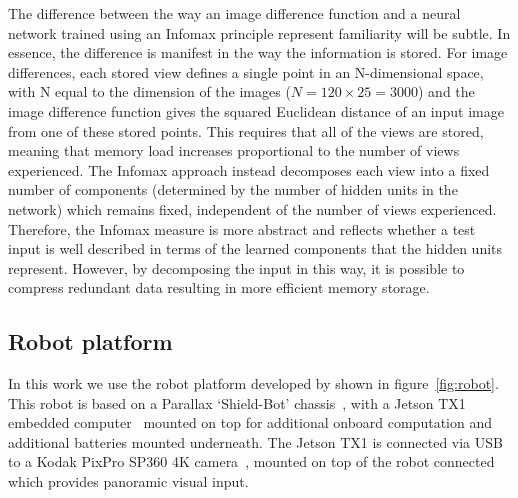 \documentclass[letterpaper]{article}
\begin{document}
The difference between the way an image difference function and a neural network trained using an Infomax principle represent familiarity will be subtle. 
In essence, the difference is manifest in the way the information is stored. 
For image differences, each stored view defines a single point in an N-dimensional space, with N equal to the dimension of the images ($N = 120 \times 25 = 3000$) and the image difference function gives the squared Euclidean distance of an input image from one of these stored points. 
This requires that all of the views are stored, meaning that memory load increases proportional to the number of views experienced. 
The Infomax approach instead decomposes each view into a fixed number of components (determined by the number of hidden units in the network) which remains fixed, independent of the number of views experienced. 
Therefore, the Infomax measure is more abstract and reflects whether a test input is well described in terms of the learned components that the hidden units represent. 
However, by decomposing the input in this way, it is possible to compress redundant data resulting in more efficient memory storage.


\subsection{Robot platform}
\label{sec:robot_platform}
In this work we use the robot platform developed by \citet{Domcsek2018} shown in figure~\ref{fig:robot}.
This robot is based on a Parallax `Shield-Bot' chassis~\citep{ParallaxInc}, with a Jetson TX1 embedded computer~\citep{NVIDIACorporation2016} mounted on top for additional onboard computation and additional batteries mounted underneath. 
The Jetson TX1 is connected via USB to a Kodak PixPro SP360 4K camera~\citep{JKImagingLtd}, mounted on top of the robot connected which provides panoramic visual input.
\end{document}
